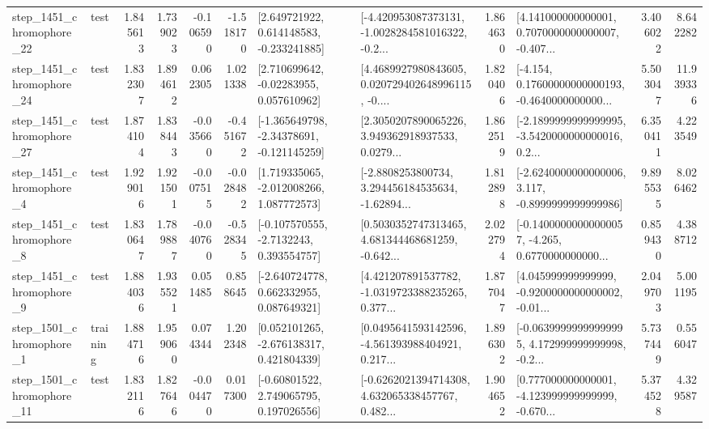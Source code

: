 \begin{tabular}{llrrrrllrlrr}
 step\_1451\_chromophore\_22 &      test &      1.845613 &    1.739023 &     -0.106590 & -1.518170 &    [2.649721922, 0.614148583, -0.233241885] &  [-4.420953087373131, -1.0028284581016322, -0.2... &       1.864630 &  [4.141000000000001, 0.7070000000000007, -0.407... &            3.406022 &          8.642282 \\
 step\_1451\_chromophore\_24 &      test &      1.832307 &    1.894612 &      0.062305 &  1.021338 &     [2.710699642, -0.02283955, 0.057610962] &  [4.4689927980843605, 0.020729402648996115, -0.... &       1.820406 &  [-4.154, 0.17600000000000193, -0.4640000000000... &            5.503047 &         11.939336 \\
 step\_1451\_chromophore\_27 &      test &      1.874104 &    1.838443 &     -0.035660 & -0.451672 &   [-1.365649798, -2.34378691, -0.121145259] &  [2.3050207890065226, 3.949362918937533, 0.0279... &       1.862519 &  [-2.1899999999999995, -3.5420000000000016, 0.2... &            6.350411 &          4.223549 \\
  step\_1451\_chromophore\_4 &      test &      1.929016 &    1.921501 &     -0.007515 & -0.028482 &    [1.719335065, -2.012008266, 1.087772573] &  [-2.8808253800734, 3.294456184535634, -1.62894... &       1.812898 &  [-2.6240000000000006, 3.117, -0.8999999999999986] &            9.895535 &          8.026462 \\
  step\_1451\_chromophore\_8 &      test &      1.830647 &    1.789887 &     -0.040760 & -0.528345 &     [-0.107570555, -2.7132243, 0.393554757] &  [0.5030352747313465, 4.681344468681259, -0.642... &       2.022794 &  [-0.14000000000000057, -4.265, 0.6770000000000... &            0.859430 &          4.388712 \\
  step\_1451\_chromophore\_9 &      test &      1.884036 &    1.935521 &      0.051485 &  0.858645 &    [-2.640724778, 0.662332955, 0.087649321] &  [4.421207891537782, -1.0319723388235265, 0.377... &       1.877047 &  [4.045999999999999, -0.9200000000000002, -0.01... &            2.049703 &          5.001195 \\
  step\_1501\_chromophore\_1 &  training &      1.884716 &    1.959060 &      0.074344 &  1.202348 &    [0.052101265, -2.676138317, 0.421804339] &  [0.0495641593142596, -4.561393988404921, 0.217... &       1.896302 &  [-0.06399999999999995, 4.172999999999998, -0.2... &            5.737449 &          0.556047 \\
 step\_1501\_chromophore\_11 &      test &      1.832116 &    1.827646 &     -0.004470 &  0.017300 &     [-0.60801522, 2.749065795, 0.197026556] &  [-0.6262021394714308, 4.632065338457767, 0.482... &       1.904652 &  [0.777000000000001, -4.123999999999999, -0.670... &            5.374528 &          4.329587 \\

\end{tabular}

